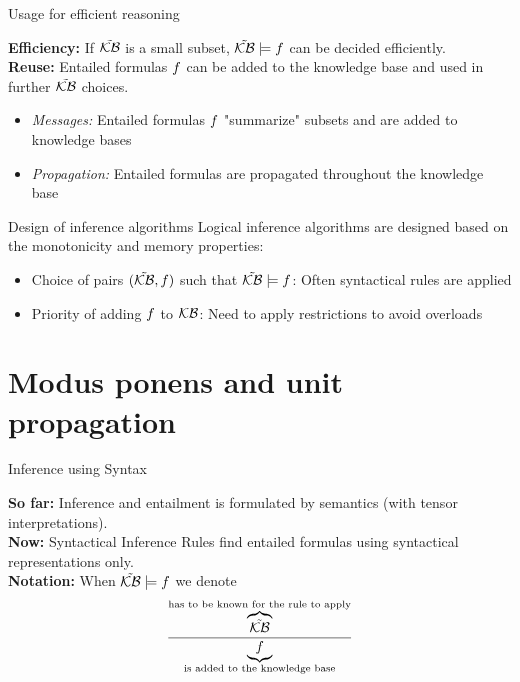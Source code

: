 \documentclass{beamer}
\begin{document}
    \begin{frame}{Usage for efficient reasoning}
        \par
        {\bf Efficiency:} If $\tilde{\mathcal{KB}}$ is a small subset, $\tilde{\mathcal{KB}}\models f$ can be decided efficiently. \\
        {\bf Reuse:} Entailed formulas $f$ can be added to the knowledge base and used in further $\tilde{\mathcal{KB}}$ choices.
        \begin{itemize}
            \item \emph{Messages:} Entailed formulas $f$ "summarize" subsets and are added to knowledge bases
            \item \emph{Propagation:} Entailed formulas are propagated throughout the knowledge base
        \end{itemize}
        \begin{block}{Design of inference algorithms}
            Logical inference algorithms are designed based on the monotonicity and memory properties:
            \begin{itemize}
                \item Choice of pairs $(\tilde{\mathcal{KB}},f)$ such that $\tilde{\mathcal{KB}}\models f$: Often syntactical rules are applied
                \item Priority of adding $f$ to $\mathcal{KB}$: Need to apply restrictions to avoid overloads
            \end{itemize}
        \end{block}
    \end{frame}


    \section{Modus ponens and unit propagation}

    \begin{frame}{Inference using Syntax}

        {\bf So far:} Inference and entailment is formulated by semantics (with tensor interpretations). \\

    {\bf Now:}
        Syntactical Inference Rules find entailed formulas using syntactical representations only. \\


        {\bf Notation:} When $\tilde{\mathcal{KB}}\models f$ we denote
        \begin{align*}
            \frac{
                \overbrace{\tilde{\mathcal{KB}}}^{\text{has to be known for the rule to apply}}
            }{
                \underbrace{f}_{\text{is added to the knowledge base}}
            }
        \end{align*}
    \end{frame}
\end{document}
